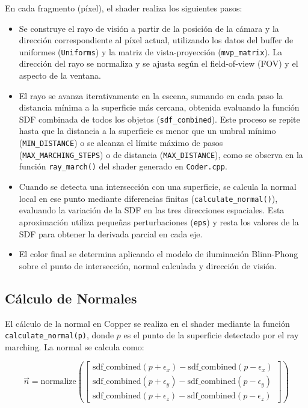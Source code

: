 En cada fragmento (píxel), el shader realiza los siguientes pasos:
\begin{itemize}
    \item Se construye el rayo de visión a partir de la posición de la cámara y la
          dirección correspondiente al píxel actual, utilizando los datos del buffer de
          uniformes (\texttt{Uniforms}) y la matriz de vista-proyección
          (\texttt{mvp\_matrix}). La dirección del rayo se normaliza y se ajusta según el
          field-of-view (FOV) y el aspecto de la ventana.
    \item El rayo se avanza iterativamente en la escena, sumando en cada paso la
          distancia mínima a la superficie más cercana, obtenida evaluando la función SDF
          combinada de todos los objetos (\texttt{sdf\_combined}). Este proceso se repite
          hasta que la distancia a la superficie es menor que un umbral mínimo
          (\texttt{MIN\_DISTANCE}) o se alcanza el límite máximo de pasos
          (\texttt{MAX\_MARCHING\_STEPS}) o de distancia (\texttt{MAX\_DISTANCE}), como
          se observa en la función \texttt{ray\_march()} del shader generado en
          \texttt{Coder.cpp}.
    \item Cuando se detecta una intersección con una superficie, se calcula la normal
          local en ese punto mediante diferencias finitas (\texttt{calculate\_normal()}),
          evaluando la variación de la SDF en las tres direcciones espaciales. Esta
          aproximación utiliza pequeñas perturbaciones (\texttt{eps}) y resta los valores
          de la SDF para obtener la derivada parcial en cada eje.
    \item El color final se determina aplicando el modelo de iluminación Blinn-Phong
          sobre el punto de intersección, normal calculada y dirección de visión.
\end{itemize}

\subsection{Cálculo de Normales}

El cálculo de la normal en Copper se realiza en el shader mediante la función
\texttt{calculate\_normal(p)}, donde $p$ es el punto de la superficie detectado
por el ray marching. La normal se calcula como:

\[
    \vec{n} = \text{normalize}(
    \begin{bmatrix}
        \text{sdf\_combined}(p+\epsilon_x) - \text{sdf\_combined}(p-\epsilon_x) \\
        \text{sdf\_combined}(p+\epsilon_y) - \text{sdf\_combined}(p-\epsilon_y) \\
        \text{sdf\_combined}(p+\epsilon_z) - \text{sdf\_combined}(p-\epsilon_z)
    \end{bmatrix}
    )
\]

